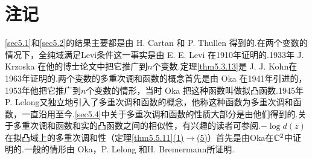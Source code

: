 \section*{注记}
\ref{sec5.1}和\ref{sec5.2}的结果主要都是由 H. Cartan 和 P. Thullen\cite{cartan1932theorie} 得到的.在两个变数的情况下，全纯域满足Levi条件这一事实是由 E. E. Levi 在1910年证明的.1933年 J. Krzoska 在他的博士论文中把它推广到$n$个变数.定理\ref{thm5.3.13}是 J. J. Kohn\cite{kohn1963harmonic}在1963年证明的.两个变数的多重次调和函数的概念首先是由 Oka\cite{oka1984collected} 在1941年引进的，1953年他把它推广到$n$个变数的情形，当时 Oka 把这种函数叫做拟凸函数.1945年 P. Lelong\cite{lelong1945fonctions}又独立地引入了多重次调和函数的概念，他称这种函数为多重次调和函数，一直沿用至今.\ref{sec5.4}中关于多重次调和函数的性质大部分是由他们得到的.关于多重次调和函数和实的凸函数之间的相似性，有兴趣的读者可参阅\cite{bremermann1956complex}.$-\log d(z)$在拟凸域上的多重次调和性（定理\ref{thm5.5.11}\hyperlink{5.5.11}{(1)}$\to$\hyperlink{5.5.11}{(5)}）首先是由Oka\cite{oka1984collected}在$\mathbb C^2$中证明的.一般的情形由 Oka\cite[155$\sim$157]{oka1984collected}，P. Lelong\cite{lelong1952convexite} 和H. Bremermann\cite{bremermann1956complex}所证明.